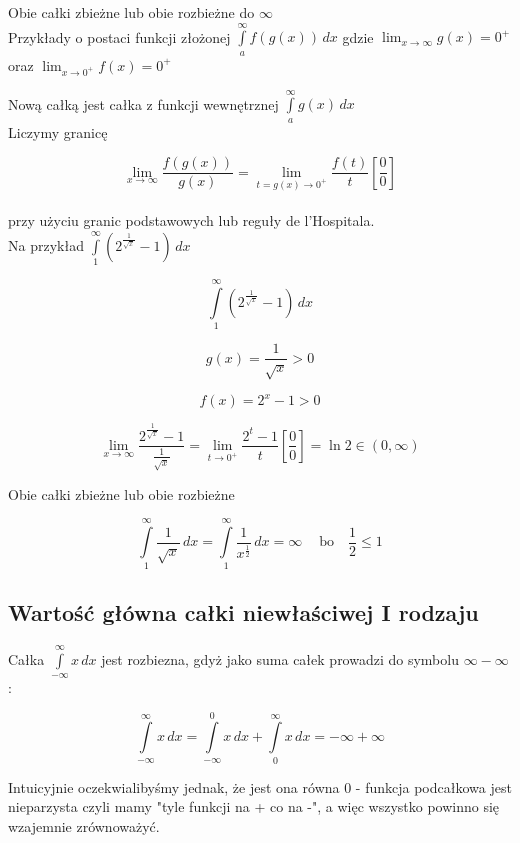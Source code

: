 \documentclass[12pt]{article}
\begin{document}
Obie całki zbieżne lub obie rozbieżne do $\infty$ \\

Przykłady o postaci funkcji złożonej $ \int\limits_{a}^{\infty} f(g(x)) \,dx $
gdzie $ \lim_{x \to \infty} g(x) = 0^+ $ oraz $ \lim_{x \to 0^+} f(x) = 0^+ $

Nową całką jest całka z funkcji wewnętrznej $ \int\limits_{a}^{\infty} g(x) \,dx $ \\

Liczymy granicę

$$ \lim_{x \to \infty} \frac{f(g(x))}{g(x)} = \lim_{t = g(x) \to 0^+} \frac{f(t)}{t} \left[ \frac{0}{0} \right] $$ \\

przy użyciu granic podstawowych lub reguły de l'Hospitala. \\

Na przykład $ \int\limits_{1}^{\infty} \left( 2^{\frac{1}{\sqrt{x}}} - 1 \right) \,dx$

$$ \int\limits_{1}^{\infty} \left( 2^{\frac{1}{\sqrt{x}}} - 1 \right) \,dx $$

$$ g(x) = \frac{1}{\sqrt{x}} > 0 $$

$$ f(x) = 2^x - 1 > 0 $$

$$ \lim_{x \to \infty} \frac{2^{\frac{1}{\sqrt{x}}} - 1}{\frac{1}{\sqrt{x}}} = \lim_{t \to 0^+} \frac{2^t - 1}{t}
\left[ \frac{0}{0} \right] = \ln 2 \in (0, \infty) $$

Obie całki zbieżne lub obie rozbieżne

$$ \int\limits_1^\infty \frac{1}{\sqrt{x}} \,dx = \int\limits_1^\infty \frac{1}{x^{\frac{1}{2}}} \,dx = \infty\ \quad
\textrm{bo} \quad \frac{1}{2} \leq 1 $$

\subsection*{Wartość główna całki niewłaściwej I rodzaju}

Całka $ \int\limits_{-\infty}^{\infty} x \,dx $ jest rozbiezna, gdyż jako suma całek prowadzi do symbolu $ \infty - \infty $:

$$ \int\limits_{-\infty}^{\infty} x \,dx = \int\limits_{-\infty}^{0} x \,dx + \int\limits_{0}^{\infty} x \,dx = -\infty + \infty $$

Intuicyjnie oczekwialibyśmy jednak, że jest ona równa 0 - funkcja podcałkowa jest nieparzysta czyli mamy "tyle funkcji
na + co na -", a więc wszystko powinno się wzajemnie zrównoważyć.
\end{document}
